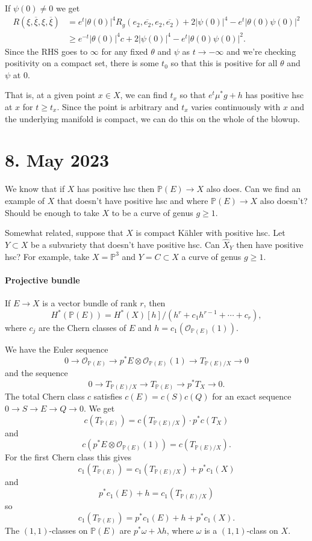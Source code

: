\documentclass[11pt]{amsart}
\theoremstyle{definition}
\newcommand{\kk}[1]{\mathbb{#1}}
\newcommand{\cc}[1]{\mathcal{#1}}
\def\ov#1{\overline{#1}}
\begin{document}
If $\psi(0) \not= 0$ we get
\begin{align*}
R(\xi, \ov\xi, \xi, \ov\xi)
&= e^t |\theta(0)|^4 R_g(e_2, \ov{e_2}, e_2, \ov{e_2})
+ 2 |\psi(0)|^4
- e^t |\theta(0) \psi(0)|^2
\\
&\geq
e^{-t} |\theta(0)|^4 c
+ 2 |\psi(0)|^4
- e^t |\theta(0) \psi(0)|^2.
\end{align*}
Since the RHS goes to $\infty$ for any fixed $\theta$ and $\psi$ as $t \to
-\infty$ and we're checking positivity on a compact set, there is some $t_0$
so that this is positive for all $\theta$ and $\psi$ at $0$.

That is, at a given point $x \in X$, we can find $t_x$ so that $e^t \mu^* g + h$
has positive hsc at $x$ for $t \geq t_x$.
Since the point is arbitrary and $t_x$ varies continuously with $x$ and the
underlying manifold is compact, we can do this on the whole of the blowup.



\section{8. May 2023}

We know that if $X$ has positive hsc then $\kk P(E) \to X$ also does.
Can we find an example of $X$ that doesn't have positive hsc and where $\kk
P(E) \to X$ also doesn't?
Should be enough to take $X$ to be a curve of genus $g \geq 1$.

Somewhat related, suppose that $X$ is compact K\"ahler with positive hsc.
Let $Y \subset X$ be a subvariety that doesn't have positive hsc.
Can $\widehat X_Y$ then have positive hsc?
For example, take $X = \kk P^3$ and $Y = C \subset X$ a curve of genus $g \geq 1$.


\paragraph{Projective bundle}

If $E \to X$ is a vector bundle of rank $r$, then
$$
H^*(\kk P(E))
= H^*(X)[h] / (h^{r} + c_1 h^{r-1} + \cdots + c_{r} ),
$$
where $c_j$ are the Chern classes of $E$ and $h = c_1(\cc O_{\kk P(E)}(1))$.

We have the Euler sequence
$$
0
\to \cc O_{\kk P(E)}
\to p^*E \otimes \cc O_{\kk P(E)}(1)
\to T_{\kk P(E)/X}
\to 0
$$
and the sequence
$$
0
\to T_{\kk P(E)/X}
\to T_{\kk P(E)}
\to p^* T_X
\to 0.
$$
The total Chern class $c$ satisfies $c(E) = c(S) c(Q)$ for an exact sequence $0
\to S \to E \to Q \to 0$.
We get
$$
c(T_{\kk P(E)}) = c(T_{\kk P(E)/X}) \cdot p^* c(T_X)
$$
and
$$
c(p^*E \otimes \cc O_{\kk P(E)}(1))
= c(T_{\kk P(E)/X}).
$$
For the first Chern class this gives
$$
c_1(T_{\kk P(E)})
= c_1(T_{\kk P(E)/X}) + p^* c_1(X)
$$
and
$$
p^*c_1(E) + h
= c_1(T_{\kk P(E)/X})
$$
so
$$
c_1(T_{\kk P(E)})
= p^*c_1(E) + h + p^* c_1(X).
$$
The $(1,1)$-classes on $\kk P(E)$ are $p^* \omega + \lambda h$, where $\omega$
is a $(1,1)$-class on $X$.
\end{document}
